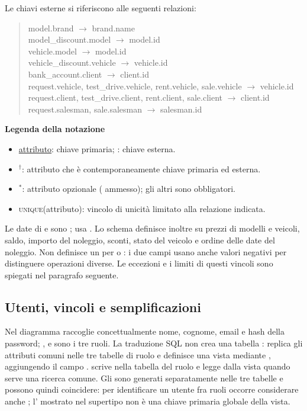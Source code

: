 \noindent Le chiavi esterne si riferiscono alle seguenti relazioni:
\begin{quote}
\ttfamily\small\raggedright
model.brand $\rightarrow$ brand.name\\
model\_discount.model $\rightarrow$ model.id\\
vehicle.model $\rightarrow$ model.id\\
vehicle\_discount.vehicle $\rightarrow$ vehicle.id\\
bank\_account.client $\rightarrow$ client.id\\
request.vehicle, test\_drive.vehicle, rent.vehicle, sale.vehicle $\rightarrow$ vehicle.id\\
request.client, test\_drive.client, rent.client, sale.client $\rightarrow$ client.id\\
request.salesman, sale.salesman $\rightarrow$ salesman.id
\end{quote}

\begin{samepage}
\noindent\textbf{Legenda della notazione}
\begin{itemize}
\item[] \uline{attributo}: chiave primaria; : chiave esterna.
\item[] $^{\dagger}$: attributo che è contemporaneamente chiave primaria ed esterna.
\item[] $^{\ast}$: attributo opzionale ( ammesso); gli altri sono obbligatori.
\item[] \textsc{unique}(attributo): vincolo di unicità limitato alla relazione indicata.
\end{itemize}
\end{samepage}

Le date di  e  sono ;  usa . Lo schema definisce inoltre  su prezzi di modelli e veicoli, saldo, importo del noleggio, sconti, stato del veicolo e ordine delle date del noleggio. Non definisce un  per  o : i due campi usano anche valori negativi per distinguere operazioni diverse. Le eccezioni e i limiti di questi vincoli sono spiegati nel paragrafo seguente.

\subsection{Utenti, vincoli e semplificazioni}

Nel diagramma  raccoglie concettualmente nome, cognome, email e hash della password; ,  e  sono i tre ruoli. La traduzione SQL non crea una tabella : replica gli attributi comuni nelle tre tabelle di ruolo e definisce una vista  mediante , aggiungendo il campo .  scrive nella tabella del ruolo e legge dalla vista quando serve una ricerca comune. Gli  sono generati separatamente nelle tre tabelle e possono quindi coincidere: per identificare un utente fra ruoli occorre considerare anche ; l' mostrato nel supertipo non è una chiave primaria globale della vista.

